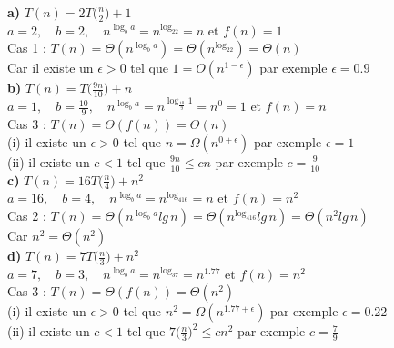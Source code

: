 \documentclass[12pt]{article}
\begin{document}
\textbf{a) } \(T(n)=2T\big(\frac{n}{2}\big)+1\) \\

\(a=2, \quad b=2, \quad n^{\log_ba} = n^{\log_22}=n \text{ et } f(n) = 1\) \\

Cas 1 : \(T(n) = \Theta(n^{\log_ba}) = \Theta(n^{\log_22}) = \Theta(n) \) \\

Car il existe un \(\epsilon>0\) tel que \(1 = O(n^{1-\epsilon}) \) par exemple \(\epsilon=0.9\) \\

\textbf{b) } \(T(n)=T\big(\frac{9n}{10}\big)+n\) \\

\(a=1, \quad b=\frac{10}{9}, \quad n^{\log_ba} = n^{\log_{\frac{10}{9}}1}=n^0=1 \text{ et } f(n) = n\) \\

Cas 3 : \(T(n)=\Theta(f(n))= \Theta(n) \) \\

(i) il existe un \(\epsilon>0\) tel que \(n = \Omega(n^{0+\epsilon}) \) par exemple \(\epsilon=1\) \\
(ii) il existe un \(c < 1\) tel que \( \frac{9n}{10} \leq cn \) par exemple \(c=\frac{9}{10}\) \\

\textbf{c) } \(T(n)=16T\big(\frac{n}{4}\big)+n^2\) \\

\(a=16, \quad b=4, \quad n^{\log_ba} = n^{\log_416}=n \text{ et } f(n) = n^2\) \\

Cas 2 : \(T(n) = \Theta(n^{\log_ba}lg \, n) = \Theta(n^{\log_416}lg \, n) = \Theta(n^2lg \, n) \) \\

Car \(n^2 = \Theta(n^2) \) \\

\textbf{d) } \(T(n)=7T\big(\frac{n}{3}\big)+n^2\) \\

\(a=7, \quad b=3, \quad n^{\log_ba} = n^{\log_37}=n^{1.77} \text{ et } f(n) = n^2\) \\

Cas 3 : \(T(n)=\Theta(f(n))= \Theta(n^2) \) \\

(i) il existe un \(\epsilon>0\) tel que \(n^2 = \Omega(n^{1.77+\epsilon}) \) par exemple \(\epsilon=0.22\) \\
(ii) il existe un \(c < 1\) tel que \( 7 \big(\frac{n}{3} \big)^2 \leq cn^2 \) par exemple \(c=\frac{7}{9}\) \\
\end{document}
